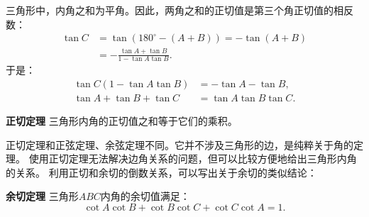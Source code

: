 \documentclass[12pt,UTF8]{ctexbook}
\begin{document}
三角形中，内角之和为平角。因此，两角之和的正切值是第三个角正切值的相反数：
\begin{align*}
    \tan C &= \tan (180^\circ - (A + B)) = - \tan (A + B)  \\
    &= - \frac{\tan A + \tan B}{1 - \tan A \tan B}.  
\end{align*}
于是：
\begin{align*}
    \tan C (1 - \tan A \tan B) &= - \tan A - \tan B,  \\
    \tan A + \tan B + \tan C &= \tan A \tan B \tan C. 
\end{align*}
\begin{tm}{\textbf{正切定理}}\label{tm:2-5-10}
    三角形内角的正切值之和等于它们的乘积。
\end{tm}
正切定理和正弦定理、余弦定理不同。它并不涉及三角形的边，是纯粹关于角的定理。
使用正切定理无法解决边角关系的问题，但可以比较方便地给出三角形内角的关系。
利用正切和余切的倒数关系，可以写出关于余切的类似结论：
\begin{tm}{\textbf{余切定理}}\label{tm:2-5-20}
    三角形$ABC$内角的余切值满足：
    $$ \cot A \cot B + \cot B \cot C + \cot C \cot A = 1.$$
\end{tm}
\end{document}
